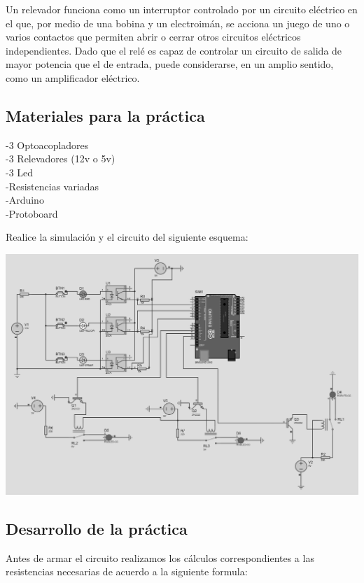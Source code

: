 \documentclass[12pt,a4paper]{article}
\begin{document}
Un relevador funciona como un interruptor controlado por un circuito eléctrico en el que, por medio de una bobina y un electroimán, se acciona un juego de uno o varios contactos que permiten abrir o cerrar otros circuitos eléctricos independientes.
Dado que el relé es capaz de controlar un circuito de salida de mayor potencia que el de entrada, puede considerarse, en un amplio sentido, como un amplificador eléctrico.\\
\newpage
\begin{center}
\subsection{Materiales para la práctica}
\end{center}
\begin{flushleft}
-3 Optoacopladores\\
-3 Relevadores (12v o 5v)\\
-3 Led \\
-Resistencias variadas\\
-Arduino \\
-Protoboard\linebreak

Realice la simulación y el circuito del siguiente esquema:\\
\end{flushleft}
\includegraphics[scale=0.19]{imagenes/circuito.JPG}
\newpage
\begin{flushleft}
\subsection{Desarrollo de la práctica}
Antes de armar el circuito realizamos los cálculos correspondientes a las resistencias necesarias de acuerdo a la siguiente formula: \\
\end{flushleft}
\end{document}
